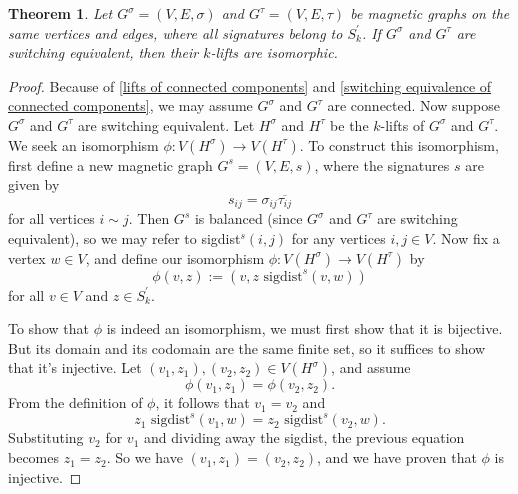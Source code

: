 \documentclass[12pt]{article}
\newtheorem{thm}{Theorem}
\theoremstyle{definition}
\begin{document}
\begin{thm}\label{switching equivalent graphs have isomorphic lifts}
Let $G^\sigma=(V, E, \sigma)$ and $G^\tau=(V, E, \tau)$ be magnetic graphs on the same vertices and edges, where all signatures belong to $S^\prime_k$. If $G^\sigma$ and $G^\tau$ are switching equivalent, then their $k$-lifts are isomorphic.
\end{thm}
\begin{proof}
Because of \cref{lifts of connected components} and \cref{switching equivalence of connected components}, we may assume $G^\sigma$ and $G^\tau$ are connected. Now suppose $G^\sigma$ and $G^\tau$ are switching equivalent. Let $H^\sigma$ and $H^\tau$ be the $k$-lifts of $G^\sigma$ and $G^\tau$. We seek an isomorphism $\phi: V(H^\sigma) \rightarrow V(H^\tau)$. To construct this isomorphism, first define a new magnetic graph $G^s = (V, E, s)$, where the signatures $s$ are given by 
$$s_{ij} = \sigma_{ij}\overline{\tau_{ij}}$$
for all vertices $i \sim j$. Then $G^s$ is balanced (since $G^\sigma$ and $G^\tau$ are switching equivalent), so we may refer to sigdist$^s(i, j)$ for any vertices $i, j \in V$. Now fix a vertex $w \in V$, and define our isomorphism $\phi: V(H^\sigma) \rightarrow V(H^\tau)$ by
$$
\phi(v, z) := (v, z \text{ sigdist}^s(v, w))
$$
for all $v \in V$ and $z \in S^\prime_k$.

To show that $\phi$ is indeed an isomorphism, we must first show that it is bijective. But its domain and its codomain are the same finite set, so it suffices to show that it's injective. Let $(v_1, z_1), (v_2, z_2) \in V(H^\sigma)$, and assume 
$$\phi(v_1, z_1) = \phi(v_2, z_2).$$ 
From the definition of $\phi$, it follows that $v_1 = v_2$ and 
$$z_1 \text{ sigdist}^s (v_1, w) = z_2 \text{ sigdist}^s (v_2, w).$$
Substituting $v_2$ for $v_1$ and dividing away the sigdist, the previous equation becomes $z_1 = z_2$. So we have $(v_1, z_1) = (v_2, z_2)$, and we have proven that $\phi$ is injective. 


\end{proof}
\end{document}
